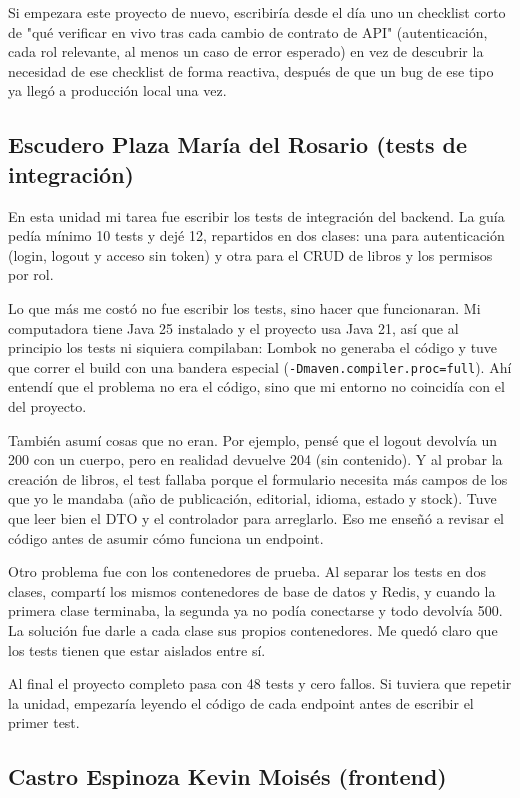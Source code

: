\documentclass[12pt,a4paper]{article}
\begin{document}
Si empezara este proyecto de nuevo, escribiría desde el día uno un checklist corto de
"qué verificar en vivo tras cada cambio de contrato de API" (autenticación, cada rol
relevante, al menos un caso de error esperado) en vez de descubrir la necesidad de ese
checklist de forma reactiva, después de que un bug de ese tipo ya llegó a producción
local una vez.

\subsection{Escudero Plaza María del Rosario (tests de integración)}

En esta unidad mi tarea fue escribir los tests de integración del backend. La guía pedía
mínimo 10 tests y dejé 12, repartidos en dos clases: una para autenticación (login,
logout y acceso sin token) y otra para el CRUD de libros y los permisos por rol.

Lo que más me costó no fue escribir los tests, sino hacer que funcionaran. Mi
computadora tiene Java 25 instalado y el proyecto usa Java 21, así que al principio los
tests ni siquiera compilaban: Lombok no generaba el código y tuve que correr el build con
una bandera especial (\texttt{-Dmaven.compiler.proc=full}). Ahí entendí que el problema
no era el código, sino que mi entorno no coincidía con el del proyecto.

También asumí cosas que no eran. Por ejemplo, pensé que el logout devolvía un 200 con un
cuerpo, pero en realidad devuelve 204 (sin contenido). Y al probar la creación de
libros, el test fallaba porque el formulario necesita más campos de los que yo le
mandaba (año de publicación, editorial, idioma, estado y stock). Tuve que leer bien el
DTO y el controlador para arreglarlo. Eso me enseñó a revisar el código antes de asumir
cómo funciona un endpoint.

Otro problema fue con los contenedores de prueba. Al separar los tests en dos clases,
compartí los mismos contenedores de base de datos y Redis, y cuando la primera clase
terminaba, la segunda ya no podía conectarse y todo devolvía 500. La solución fue darle
a cada clase sus propios contenedores. Me quedó claro que los tests tienen que estar
aislados entre sí.

Al final el proyecto completo pasa con 48 tests y cero fallos. Si tuviera que repetir la
unidad, empezaría leyendo el código de cada endpoint antes de escribir el primer test.

\subsection{Castro Espinoza Kevin Moisés (frontend)}
\label{sec:reflexion-kevin}
\end{document}
